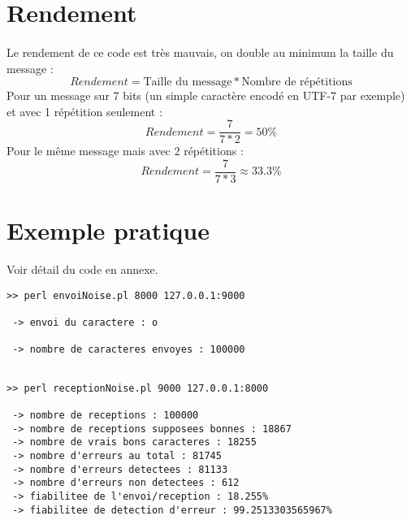     \section{Rendement}

        \paragraph{}
Le rendement de ce code est très mauvais, on double au minimum la taille du message :
\[  Rendement = \text{Taille du message}*\text{Nombre de répétitions} \]
Pour un message sur 7 bits (un simple caractère encodé en UTF-7 par exemple) et avec 1 répétition seulement :
\[  Rendement = \frac{7}{7*2} = 50\% \]
Pour le même message mais avec 2 répétitions :
\[  Rendement = \frac{7}{7*3} \approx 33.3\% \]


    \clearpage
    \section{Exemple pratique}

        \lstset{
            language=bash, basicstyle=\ttfamily\small, columns=flexible,
            tabsize=2, extendedchars=true, showspaces=false,
            showstringspaces=false, numbers=left, numberstyle=\tiny,
            breaklines=true, breakautoindent=true, captionpos=b
        }
Voir détail du code en annexe.
        \begin{lstlisting}
>> perl envoiNoise.pl 8000 127.0.0.1:9000

 -> envoi du caractere : o

 -> nombre de caracteres envoyes : 100000

        \end{lstlisting}

        \begin{lstlisting}

>> perl receptionNoise.pl 9000 127.0.0.1:8000

 -> nombre de receptions : 100000
 -> nombre de receptions supposees bonnes : 18867
 -> nombre de vrais bons caracteres : 18255
 -> nombre d'erreurs au total : 81745
 -> nombre d'erreurs detectees : 81133
 -> nombre d'erreurs non detectees : 612
 -> fiabilitee de l'envoi/reception : 18.255%
 -> fiabilitee de detection d'erreur : 99.2513303565967%

        \end{lstlisting}
